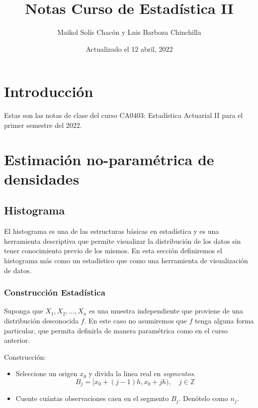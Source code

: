 \documentclass[
  12pt,
]{book}
\title{Notas Curso de Estadística II}
\author{Maikol Solís Chacón y Luis Barboza Chinchilla}
\date{Actualizado el 12 abril, 2022}
\theoremstyle{definition}
\theoremstyle{definition}
\theoremstyle{definition}
\theoremstyle{definition}
\theoremstyle{remark}
\begin{document}
\maketitle

{
\hypersetup{linkcolor=}
\setcounter{tocdepth}{4}
\tableofcontents
}
\hypertarget{introducciuxf3n}{%
\chapter{Introducción}\label{introducciuxf3n}}

Estas son las notas de clase del curso CA0403: Estadística Actuarial II para el primer semestre del 2022.

\hypertarget{estimaciuxf3n-no-paramuxe9trica-de-densidades}{%
\chapter{Estimación no-paramétrica de densidades}\label{estimaciuxf3n-no-paramuxe9trica-de-densidades}}

\hypertarget{histograma}{%
\section{Histograma}\label{histograma}}

El histograma es una de las estructuras básicas en estadística y es una herramienta descriptiva que permite visualizar la distribución de los datos sin tener conocimiento previo de los mismos. En esta sección definiremos el histograma más como un estadístico que como una herramienta de visualización de datos.

\hypertarget{construcciuxf3n-estaduxedstica}{%
\subsection{Construcción Estadística}\label{construcciuxf3n-estaduxedstica}}

Suponga que \(X_1,X_2, \dots ,X_n\) es una muestra independiente que proviene de una distribución desconocida \(f\). En este caso no asumiremos que \(f\) tenga alguna forma particular, que permita definirla de manera paramétrica como en el curso anterior.

Construcción:

\begin{itemize}
\item
  Seleccione un origen \(x_0\) y divida la linea real en \emph{segmentos}.
  \begin{equation*}
  B_j = [x_0 +(j - 1)h,x_0 + jh), \quad j\in \mathbb{Z}
  \end{equation*}
\item
  Cuente cuántas observaciones caen en el segmento \(B_j\). Denótelo como \(n_j\).
\end{itemize}
\end{document}
